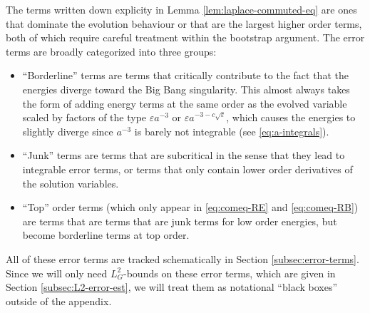 \documentclass[11pt,leqno,textwidth=10cm]{amsart}
\numberwithin{equation}{section}
\theoremstyle{definition}
\theoremstyle{plain}
\newcommand{\1}{\mathbbm{1}}
\renewcommand{\epsilon}{\varepsilon}
\begin{document}
The terms written down explicity in Lemma \ref{lem:laplace-commuted-eq} are ones that dominate the evolution behaviour or that are the largest higher order terms, both of which require careful treatment within the bootstrap argument. The error terms are broadly categorized into three groups:
\begin{itemize}
\item \enquote{Borderline} terms are terms that critically contribute to the fact that the energies diverge toward the Big Bang singularity. This almost always takes the form of adding energy terms at the same order as the evolved variable scaled by factors of the type $\epsilon a^{-3}$ or $\epsilon a^{-3-c\sqrt{\epsilon}}$, which causes the energies to slightly diverge since $a^{-3}$ is barely not integrable (see \eqref{eq:a-integrals}).
\item \enquote{Junk} terms are terms that are subcritical in the sense that they lead to integrable error terms, or terms that only contain lower order derivatives of the solution variables.
\item \enquote{Top} order terms (which only appear in \eqref{eq:comeq-RE} and \eqref{eq:comeq-RB}) are terms that are terms that are junk terms for low order energies, but become borderline terms at top order.
\end{itemize}
All of these error terms are tracked schematically in Section \ref{subsec:error-terms}. Since we will only need $L^2_G$-bounds on these error terms, which are given in Section \ref{subsec:L2-error-est}, we will treat them as notational \enquote{black boxes} outside of the appendix.
\end{document}
